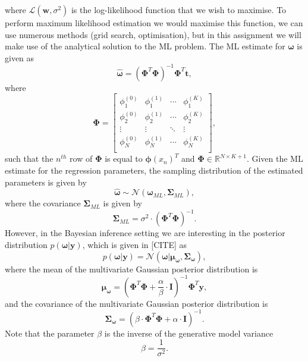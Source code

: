 \documentclass{article}
\begin{document}
where $\mathcal{L}(\mathbf{w}, \sigma^2)$ is the log-likelihood function that we wish to maximise. To perform maximum likelihood estimation  we would maximise this function, we can use numerous methods (grid search, optimisation), but in this assignment we will make use of the analytical solution to the ML problem. The ML estimate for $\boldsymbol\omega$ is given as
\begin{equation}
\hat{\boldsymbol\omega} = \left( \boldsymbol\Phi^T \boldsymbol\Phi \right)^{-1} \boldsymbol\Phi^T \mathbf{t},
\end{equation}
where 
\begin{equation}
\boldsymbol\Phi = 
\begin{bmatrix}
\phi_1^{(0)} & \phi_1^{(1)} & \cdots & \phi_1^{(K)} \\
\phi_2^{(0)} & \phi_2^{(1)} & \cdots & \phi_2^{(K)} \\
\vdots & \vdots & \ddots & \vdots \\
\phi_N^{(0)} & \phi_N^{(1)} & \cdots & \phi_N^{(K)} \\
\end{bmatrix},
\end{equation}
such that the $n^{th}$ row of $\boldsymbol\Phi$ is equal to $\boldsymbol\phi(x_n)^T$ and $\boldsymbol\Phi \in \mathbb{R}^{N \times K + 1}$. Given the ML estimate for the regression parameters, the sampling distribution of the estimated parameters is given by
\begin{equation}
\hat{\boldsymbol\omega} \sim \mathcal{N}(\boldsymbol\omega_{ML}, \boldsymbol\Sigma_{ML}),
\end{equation}
where the covariance $\boldsymbol\Sigma_{ML}$ is given by
\begin{equation}
\boldsymbol\Sigma_{ML} = \sigma^2 \cdot \left(\boldsymbol\Phi^T \boldsymbol\Phi\right)^{-1}.
\end{equation}
However, in the Bayesian inference setting we are interesting in the posterior distribution $p(\boldsymbol\omega \vert \mathbf{y})$, which is given in [CITE] as
\begin{equation}
p(\boldsymbol\omega \vert \mathbf{y}) = \mathcal{N}\left(\boldsymbol\omega \vert \boldsymbol\mu_{\boldsymbol\omega}, \boldsymbol\Sigma_{\boldsymbol\omega}  \right),
\end{equation}
where the mean of the multivariate Gaussian posterior distribution is
\begin{equation}
\boldsymbol\mu_{\boldsymbol\omega} = \left( \boldsymbol\Phi^T \boldsymbol\Phi + \frac{\alpha}{\beta}\cdot \mathbf{I}  \right)^{-1} \boldsymbol\Phi^T \mathbf{y},
\end{equation}
and the covariance of the multivariate Gaussian posterior distribution is
\begin{equation}
\boldsymbol\Sigma_{\boldsymbol\omega} = \left( \beta \cdot \boldsymbol\Phi^T \boldsymbol\Phi + \alpha \cdot \mathbf{I}  \right)^{-1}.
\end{equation}
Note that the parameter $\beta$ is the inverse of the generative model variance
\begin{equation}
\beta = \frac{1}{\sigma^2}.
\end{equation}
\end{document}
